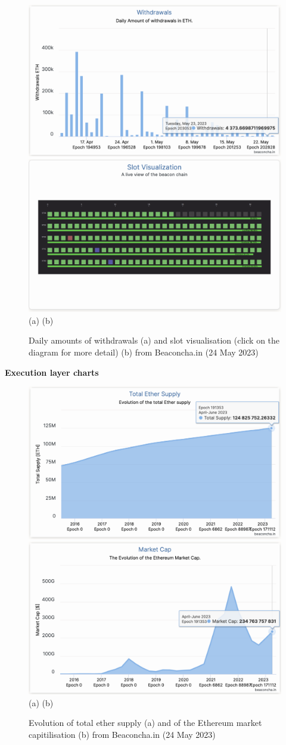 \documentclass[UTF8]{article}
\begin{document}
\begin{figure}[htbp]
\begin{center}
\includegraphics[width=0.48\linewidth]{images/bchart15}
\includegraphics[width=0.48\linewidth]{images/bchart16} \\
(a)\hspace{160pt}        (b)\\
\caption{Daily amounts of withdrawals (a) and slot visualisation (click on the diagram for more detail) (b) from Beaconcha.in (24 May 2023)}
\label{fig:chart15}
\end{center}
\end{figure}
\clearpage

\textbf{Execution layer charts}\\
\begin{figure}[htbp]
\begin{center}
\includegraphics[width=0.48\linewidth]{images/bchart17}
\includegraphics[width=0.48\linewidth]{images/bchart18} \\
(a)\hspace{160pt}        (b)\\
\caption{Evolution of total ether supply (a) and of the Ethereum market capitilisation (b) from Beaconcha.in (24 May 2023)}
\label{fig:chart17}
\end{center}
\end{figure}
\end{document}
